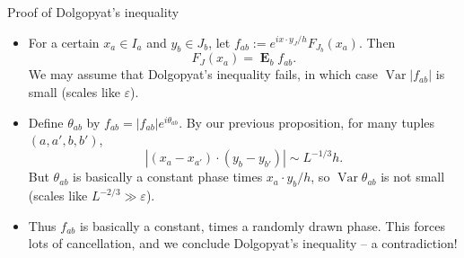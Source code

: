 \documentclass[10pt]{beamer}
\DeclareMathOperator{\Var}{Var}
\DeclareMathOperator*{\Expect}{\mathbf E}
\begin{document}
\begin{frame}{Proof of Dolgopyat's inequality}
\begin{itemize}
\item For a certain $x_a \in I_a$ and $y_b \in J_b$, let $f_{ab} := e^{ix\cdot y_J/h} F_{J_b}(x_a)$. Then 
$$F_J(x_a) = \Expect_b f_{ab}.$$
We may assume that Dolgopyat's inequality fails, in which case $\Var |f_{ab}|$ is small (scales like $\varepsilon$). \pause
\item Define $\theta_{ab}$ by $f_{ab} = |f_{ab}| e^{i\theta_{ab}}$. By our previous proposition, for many tuples $(a, a', b, b')$,
$$|(x_a - x_{a'}) \cdot (y_b - y_{b'})| \sim L^{-1/3} h.$$
But $\theta_{ab}$ is basically a constant phase times $x_a \cdot y_b/h$, so $\Var \theta_{ab}$ is not small (scales like $L^{-2/3} \gg \varepsilon$). \pause
\item Thus $f_{ab}$ is basically a constant, times a randomly drawn phase. This forces lots of cancellation, and we conclude Dolgopyat's inequality -- a contradiction!
\end{itemize}
\end{frame}
\end{document}

